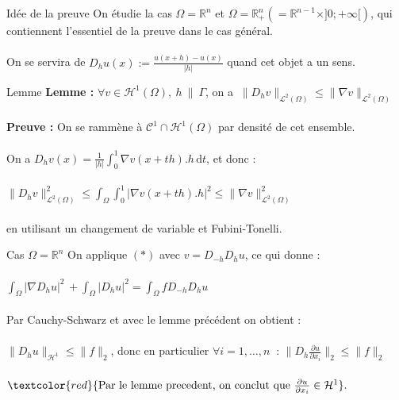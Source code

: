 \documentclass[10pt]{beamer}
\begin{document}
\begin{frame}{Idée de la preuve}
On étudie la cas $\Omega=\mathbb{R}^n$ et  $\Omega=\mathbb{R}^n_+(=\mathbb{R}^{n-1}\times ]0;+\infty[)$, qui contiennent l'essentiel de la preuve dans le cas général. \\ ~ \\ 

On se servira de $\displaystyle D_hu(x):=\frac{u(x+h)-u(x)}{|h|}$ quand cet objet a un sens.

\end{frame}


\begin{frame}{Lemme}
\textbf{Lemme :}
$\forall v \in \mathcal{H}^1(\Omega), \ h \ \| \ \Gamma$, on a $\ \|D_hv\|_{\mathcal{L}^2(\Omega)} \leq \|\nabla v\|_{\mathcal{L}^2(\Omega)}  $ \\~\\

\textbf{Preuve :} On se rammène à $\mathcal{C}^1\cap \mathcal{H}^1(\Omega)$ par densité de cet ensemble. \\~\\
On a $D_hv(x) = \displaystyle \frac{1}{|h|}\int_0^1 \nabla v(x+th).h \,\mathrm{d}t $, et donc : \\~\\

$\|D_hv\|^2_{\mathcal{L}^2(\Omega)} \leq \displaystyle \int_{\Omega} \int_0^1 | \nabla v(x+th).h|^2 \leq \| \nabla v\|^2_{\mathcal{L}^2(\Omega)}$ \\~\\

en utilisant un changement de variable et Fubini-Tonelli.

\end{frame}



\begin{frame}{Cas $\Omega=\mathbb{R}^n$}
On applique $(*)$ avec $v=D_{-h}D_hu$, ce qui donne  : \\~\\

$ \displaystyle \int_{\Omega} |\nabla D_h u|^2 \,  + \int_{\Omega} |D_hu|^2 =  \int_{\Omega} f D_{-h}D_hu  \,$ \\~\\

Par Cauchy-Schwarz et avec le lemme précédent on obtient : \\~\\ 

$\|D_hu\|_{\mathcal{H}^1} \leq \|f\|_2$, donc en particulier  $\forall i=1,\dots,n \ $ : $\displaystyle \|D_h \frac{\partial u}{\partial x_i} \|_2 \leq \|f\|_2$  \\~\\

$\textcolor{red}{\text{Par le lemme precedent, on conclut que } \frac{\partial u}{\partial x_i} \in \mathcal{H}^1}.$
\end{frame}
\end{document}

